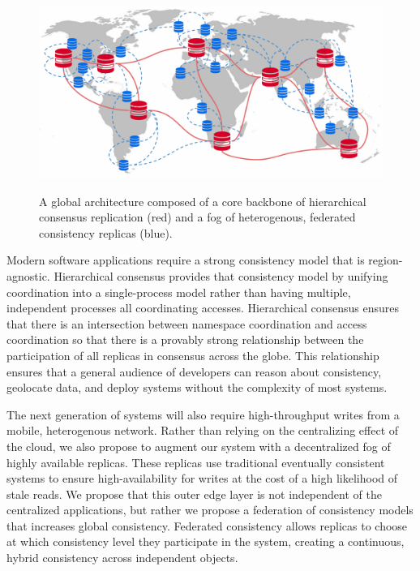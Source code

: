 \begin{figure}
    \begin{center}
        \includegraphics[width=5in]{figures/ch02_global_architecture.pdf}
    \end{center}
    \renewcommand{\baselinestretch}{1}
    \small\normalsize

    \begin{quote}
        \caption[Global Architecture]{A global architecture composed of a core backbone of hierarchical consensus replication (red) and a fog of heterogenous, federated consistency replicas (blue).}
        \label{fig:ch02_global_architecture}
    \end{quote}
\end{figure}
\renewcommand{\baselinestretch}{2}
\small\normalsize

Modern software applications require a strong consistency model that is region-agnostic.
Hierarchical consensus provides that consistency model by unifying coordination into a single-process model rather than having multiple, independent processes all coordinating accesses.
Hierarchical consensus ensures that there is an intersection between namespace coordination and access coordination so that there is a provably strong relationship between the participation of all replicas in consensus across the globe.
This relationship ensures that a general audience of developers can reason about consistency, geolocate data, and deploy systems without the complexity of most systems.

The next generation of systems will also require high-throughput writes from a mobile, heterogenous network.
Rather than relying on the centralizing effect of the cloud, we also propose to augment our system with a decentralized fog of highly available replicas.
These replicas use traditional eventually consistent systems to ensure high-availability for writes at the cost of a high likelihood of stale reads.
We propose that this outer edge layer is not independent of the centralized applications, but rather we propose a federation of consistency models that increases global consistency.
Federated consistency allows replicas to choose at which consistency level they participate in the system, creating a continuous, hybrid consistency across independent objects.

